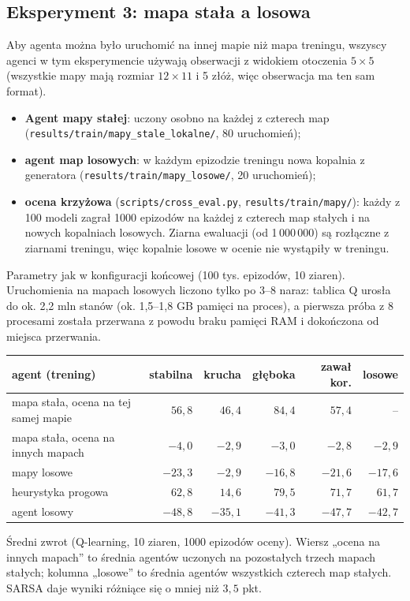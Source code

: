 \documentclass[11pt,a4paper]{article}
\begin{document}
\subsection{Eksperyment 3: mapa stała a losowa}\label{sec:losowe}
Aby agenta można było uruchomić na innej mapie niż mapa treningu, wszyscy agenci
w tym eksperymencie używają obserwacji z widokiem otoczenia $5\times5$ (wszystkie
mapy mają rozmiar $12\times11$ i 5 złóż, więc obserwacja ma ten sam format).
\begin{itemize}
  \item \textbf{Agent mapy stałej}: uczony osobno na każdej z czterech map
  (\texttt{results/\allowbreak train/\allowbreak mapy\_stale\_lokalne/}, 80 uruchomień);
  \item \textbf{agent map losowych}: w każdym epizodzie treningu nowa kopalnia
  z generatora (\texttt{results/\allowbreak train/\allowbreak mapy\_losowe/}, 20 uruchomień);
  \item \textbf{ocena krzyżowa} (\texttt{scripts/cross\_eval.py},
  \texttt{results/\allowbreak train/\allowbreak mapy/}): każdy z 100 modeli zagrał 1000 epizodów na każdej
  z czterech map stałych i na nowych kopalniach losowych. Ziarna ewaluacji
  (od 1\,000\,000) są rozłączne z ziarnami treningu, więc kopalnie losowe w ocenie
  nie wystąpiły w treningu.
\end{itemize}
Parametry jak w konfiguracji końcowej (100 tys. epizodów, 10 ziaren). Uruchomienia
na mapach losowych liczono tylko po 3--8 naraz: tablica Q urosła do ok. 2,2 mln
stanów (ok. 1,5--1,8 GB pamięci na proces), a pierwsza próba z 8 procesami została
przerwana z powodu braku pamięci RAM i dokończona od miejsca przerwania.

\begin{center}
\small
\begin{tabular}{@{}lrrrrr@{}}
\toprule
agent (trening) & stabilna & krucha & głęboka & zawał kor. & losowe \\
\midrule
mapa stała, ocena na tej samej mapie & $56{,}8$ & $46{,}4$ & $84{,}4$ & $57{,}4$ & -- \\
mapa stała, ocena na innych mapach & $-4{,}0$ & $-2{,}9$ & $-3{,}0$ & $-2{,}8$ & $-2{,}9$ \\
mapy losowe & $-23{,}3$ & $-2{,}9$ & $-16{,}8$ & $-21{,}6$ & $-17{,}6$ \\
\midrule
heurystyka progowa & $62{,}8$ & $14{,}6$ & $79{,}5$ & $71{,}7$ & $61{,}7$ \\
agent losowy & $-48{,}8$ & $-35{,}1$ & $-41{,}3$ & $-47{,}7$ & $-42{,}7$ \\
\bottomrule
\end{tabular}
\end{center}
Średni zwrot (Q-learning, 10 ziaren, 1000 epizodów oceny). Wiersz „ocena na innych
mapach” to średnia agentów uczonych na pozostałych trzech mapach stałych; kolumna
„losowe” to średnia agentów wszystkich czterech map stałych. SARSA daje wyniki
różniące się o mniej niż $3{,}5$ pkt.
\end{document}
